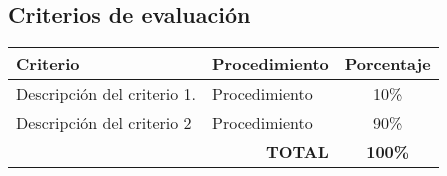 
\subsection*{Criterios de evaluación}
\begin{table}[ht!]
    \centering
    \setlength{\extrarowheight}{5pt}
    \begin{tabularx}{\textwidth}{|X|p{4cm}|c|}
    \hline
    \textbf{Criterio} & \textbf{Procedimiento} & \textbf{Porcentaje} \\
    \hline
    Descripción del criterio 1.  & Procedimiento & 10\% \\ 
    \hline
    Descripción del criterio 2 & Procedimiento & 90\% \\
    \hline
    \multicolumn{2}{|r|}{\textbf{TOTAL}} & \textbf{100\%} \\
    \hline
    \end{tabularx}
    \label{tab:evaluacion}
\end{table}